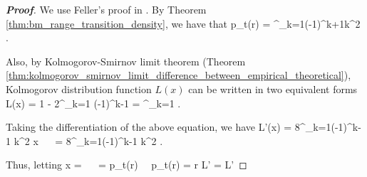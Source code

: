 \begin{proof}[\bf Proof]
We use Feller's proof in \cite{Feller_1951}. By Theorem \ref{thm:bm_range_transition_density}, we have that
\be
p_t(r) = \sum^\infty_{k=1}(-1)^{k+1}k^2 \exp{}.
\ee

Also, by Kolmogorov-Smirnov limit theorem (Theorem \ref{thm:kolmogorov_smirnov_limit_difference_between_empirical_theoretical}), Kolmogorov distribution function $L(x)$ can be written in two equivalent forms
\be
L(x) = 1 - 2\sum^\infty_{k=1} (-1)^{k-1} \exp{} =  \sum^\infty_{k=1} \exp{}.
\ee

Taking the differentiation of the above equation, we have
\be
L'(x) = 8\sum^\infty_{k=1}(-1)^{k-1} k^2 x \exp{} \ \ra \  = 8\sum^\infty_{k=1}(-1)^{k-1} k^2 \exp{}.
\ee


Thus, letting
\be
x =  \ \ra \  = \sigma{} p_t(r) \ \ra \ p_t(r) =   r L' =  L'
\ee


\end{proof}
